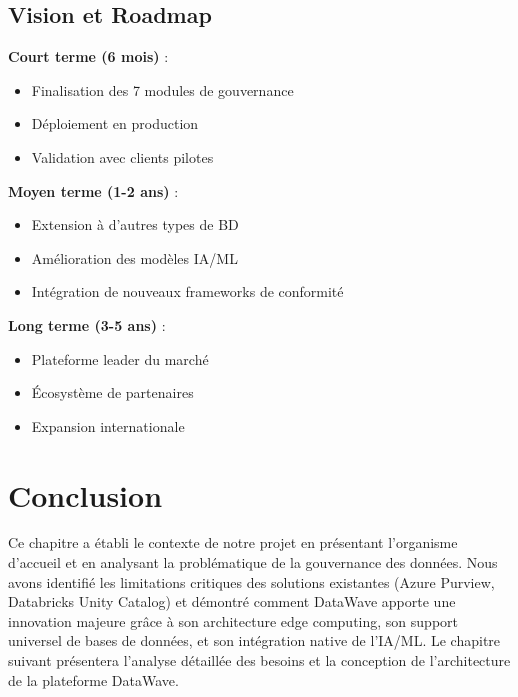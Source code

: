 \subsection{Vision et Roadmap}

\textbf{Court terme (6 mois)} :
\begin{itemize}
    \item Finalisation des 7 modules de gouvernance
    \item Déploiement en production
    \item Validation avec clients pilotes
\end{itemize}

\textbf{Moyen terme (1-2 ans)} :
\begin{itemize}
    \item Extension à d'autres types de BD
    \item Amélioration des modèles IA/ML
    \item Intégration de nouveaux frameworks de conformité
\end{itemize}

\textbf{Long terme (3-5 ans)} :
\begin{itemize}
    \item Plateforme leader du marché
    \item Écosystème de partenaires
    \item Expansion internationale
\end{itemize}

\section*{Conclusion}

Ce chapitre a établi le contexte de notre projet en présentant l'organisme d'accueil et en analysant la problématique de la gouvernance des données. Nous avons identifié les limitations critiques des solutions existantes (Azure Purview, Databricks Unity Catalog) et démontré comment DataWave apporte une innovation majeure grâce à son architecture edge computing, son support universel de bases de données, et son intégration native de l'IA/ML. Le chapitre suivant présentera l'analyse détaillée des besoins et la conception de l'architecture de la plateforme DataWave.
